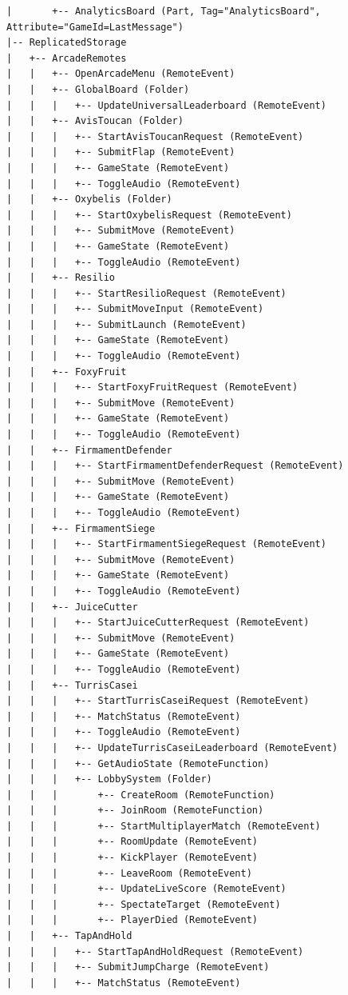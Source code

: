 \documentclass[12pt,letterpaper]{article}
\begin{document}
\begin{lstlisting}
|       +-- AnalyticsBoard (Part, Tag="AnalyticsBoard", Attribute="GameId=LastMessage")
|-- ReplicatedStorage
|   +-- ArcadeRemotes
|   |   +-- OpenArcadeMenu (RemoteEvent)
|   |   +-- GlobalBoard (Folder)
|   |   |   +-- UpdateUniversalLeaderboard (RemoteEvent)
|   |   +-- AvisToucan (Folder)
|   |   |   +-- StartAvisToucanRequest (RemoteEvent)
|   |   |   +-- SubmitFlap (RemoteEvent)
|   |   |   +-- GameState (RemoteEvent)
|   |   |   +-- ToggleAudio (RemoteEvent)
|   |   +-- Oxybelis (Folder)
|   |   |   +-- StartOxybelisRequest (RemoteEvent)
|   |   |   +-- SubmitMove (RemoteEvent)
|   |   |   +-- GameState (RemoteEvent)
|   |   |   +-- ToggleAudio (RemoteEvent)
|   |   +-- Resilio
|   |   |   +-- StartResilioRequest (RemoteEvent)
|   |   |   +-- SubmitMoveInput (RemoteEvent)
|   |   |   +-- SubmitLaunch (RemoteEvent)
|   |   |   +-- GameState (RemoteEvent)
|   |   |   +-- ToggleAudio (RemoteEvent)
|   |   +-- FoxyFruit
|   |   |   +-- StartFoxyFruitRequest (RemoteEvent)
|   |   |   +-- SubmitMove (RemoteEvent)
|   |   |   +-- GameState (RemoteEvent)
|   |   |   +-- ToggleAudio (RemoteEvent)
|   |   +-- FirmamentDefender
|   |   |   +-- StartFirmamentDefenderRequest (RemoteEvent)
|   |   |   +-- SubmitMove (RemoteEvent)
|   |   |   +-- GameState (RemoteEvent)
|   |   |   +-- ToggleAudio (RemoteEvent)
|   |   +-- FirmamentSiege
|   |   |   +-- StartFirmamentSiegeRequest (RemoteEvent)
|   |   |   +-- SubmitMove (RemoteEvent)
|   |   |   +-- GameState (RemoteEvent)
|   |   |   +-- ToggleAudio (RemoteEvent)
|   |   +-- JuiceCutter
|   |   |   +-- StartJuiceCutterRequest (RemoteEvent)
|   |   |   +-- SubmitMove (RemoteEvent)
|   |   |   +-- GameState (RemoteEvent)
|   |   |   +-- ToggleAudio (RemoteEvent)
|   |   +-- TurrisCasei
|   |   |   +-- StartTurrisCaseiRequest (RemoteEvent)
|   |   |   +-- MatchStatus (RemoteEvent)
|   |   |   +-- ToggleAudio (RemoteEvent)
|   |   |   +-- UpdateTurrisCaseiLeaderboard (RemoteEvent)
|   |   |   +-- GetAudioState (RemoteFunction)
|   |   |   +-- LobbySystem (Folder)
|   |   |       +-- CreateRoom (RemoteFunction)
|   |   |       +-- JoinRoom (RemoteFunction)
|   |   |       +-- StartMultiplayerMatch (RemoteEvent)
|   |   |       +-- RoomUpdate (RemoteEvent)
|   |   |       +-- KickPlayer (RemoteEvent)
|   |   |       +-- LeaveRoom (RemoteEvent)
|   |   |       +-- UpdateLiveScore (RemoteEvent)
|   |   |       +-- SpectateTarget (RemoteEvent)
|   |   |       +-- PlayerDied (RemoteEvent)
|   |   +-- TapAndHold
|   |   |   +-- StartTapAndHoldRequest (RemoteEvent)
|   |   |   +-- SubmitJumpCharge (RemoteEvent)
|   |   |   +-- MatchStatus (RemoteEvent)

\end{lstlisting}
\end{document}
